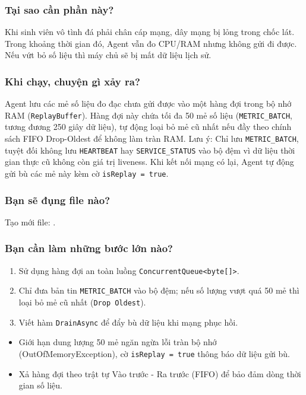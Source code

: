 \documentclass[12pt,a4paper]{article}
\begin{document}
\subsubsection{Tại sao cần phần này?}
Khi sinh viên vô tình đá phải chân cáp mạng, dây mạng bị lỏng trong chốc lát. Trong khoảng thời gian đó, Agent vẫn đo CPU/RAM nhưng không gửi đi được. Nếu vứt bỏ số liệu thì máy chủ sẽ bị mất dữ liệu lịch sử.

\subsubsection{Khi chạy, chuyện gì xảy ra?}
Agent lưu các mẻ số liệu đo đạc chưa gửi được vào một hàng đợi trong bộ nhớ RAM (\texttt{ReplayBuffer}). Hàng đợi này chứa tối đa 50 mẻ số liệu (\texttt{METRIC\_BATCH}, tương đương 250 giây dữ liệu), tự động loại bỏ mẻ cũ nhất nếu đầy theo chính sách FIFO Drop-Oldest để không làm tràn RAM. Lưu ý: Chỉ lưu \texttt{METRIC\_BATCH}, tuyệt đối không lưu \texttt{HEARTBEAT} hay \texttt{SERVICE\_STATUS} vào bộ đệm vì dữ liệu thời gian thực cũ không còn giá trị liveness. Khi kết nối mạng có lại, Agent tự động gửi bù các mẻ này kèm cờ \texttt{isReplay = true}.

\subsubsection{Bạn sẽ đụng file nào?}
Tạo mới file: .

\subsubsection{Bạn cần làm những bước lớn nào?}
\begin{enumerate}
  \item Sử dụng hàng đợi an toàn luồng \texttt{ConcurrentQueue<byte[]>}.
  \item Chỉ đưa bản tin \texttt{METRIC\_BATCH} vào bộ đệm; nếu số lượng vượt quá 50 mẻ thì loại bỏ mẻ cũ nhất (\texttt{Drop Oldest}).
  \item Viết hàm \texttt{DrainAsync} để đẩy bù dữ liệu khi mạng phục hồi.
\end{enumerate}

\begin{orientationbox}
\begin{itemize}[leftmargin=1.5em, itemsep=1pt]
  \item Giới hạn dung lượng 50 mẻ ngăn ngừa lỗi tràn bộ nhớ (OutOfMemoryException), cờ \texttt{isReplay = true} thông báo dữ liệu gửi bù.
  \item Xả hàng đợi theo trật tự Vào trước - Ra trước (FIFO) để bảo đảm dòng thời gian số liệu.
\end{itemize}
\end{orientationbox}
\end{document}
